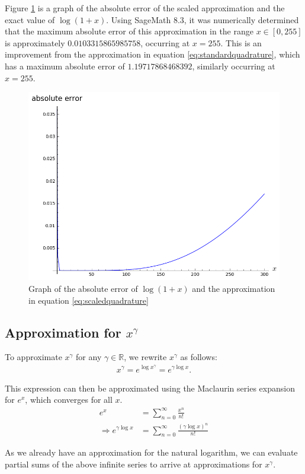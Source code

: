 Figure \ref{fig:scaledquadrature} is a graph of the absolute error of the scaled approximation and the exact value of $\log{(1+x)}$. Using SageMath 8.3, it was numerically determined that the maximum absolute error of this approximation in the range $x\in[0,255]$ is approximately $0.0103315865985758$, occurring at $x=255$. This is an improvement from the approximation in equation \ref{eq:standardquadrature}, which has a maximum absolute error of $1.19717868468392$, similarly occurring at $x=255$.

\begin{figure}[h]
    \centering
    \includegraphics[width=.9\linewidth]{figures/ModifiedQuadratureAbsoluteError.png}
    \caption{Graph of the absolute error of $\log{(1+x)}$ and the approximation in equation \ref{eq:scaledquadrature}}
    \label{fig:scaledquadrature}
\end{figure}

\subsection{Approximation for $x^\gamma$}
To approximate $x^\gamma$ for any $\gamma \in \mathbb{R}$, we rewrite $x^\gamma$ as follows:
\begin{align*}
  x^\gamma = e^{\log{x^\gamma}} = e^{\gamma\log{x}}.
\end{align*}

This expression can then be approximated using the Maclaurin series expansion for $e^x$, which converges for all $x$.
\begin{align*}
  e^x &= \sum_{n=0}^{\infty}{\frac{x^n}{n!}}\\
  \Rightarrow e^{\gamma\log{x}} &= \sum_{n=0}^{\infty}{\frac{(\gamma\log{x})^n}{n!}}
\end{align*}

As we already have an approximation for the natural logarithm, we can evaluate partial sums of the above infinite series to arrive at approximations for $x^\gamma$.